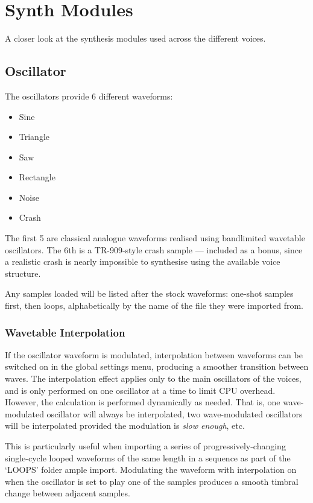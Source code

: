 \section{Synth Modules}\label{synth-modules}

A closer look at the synthesis modules used across the different voices.

\subsection{Oscillator}\label{oscillator}

The oscillators provide 6 different waveforms:

\begin{itemize}
\tightlist
\item
  Sine
\item
  Triangle
\item
  Saw
\item
  Rectangle
\item
  Noise
\item
  Crash
\end{itemize}

The first 5 are classical analogue waveforms realised using bandlimited
wavetable oscillators. The 6th is a TR-909-style crash sample ---
included as a bonus, since a realistic crash is nearly impossible to
synthesise using the available voice structure.

Any samples loaded will be listed after the stock waveforms: one-shot
samples first, then loops, alphabetically by the name of the file they
were imported from.

\subsubsection{Wavetable Interpolation}\label{wavetable-interpolation}

If the oscillator waveform is modulated, interpolation between waveforms
can be switched on in the global settings menu, producing a smoother
transition between waves. The interpolation effect applies only to the
main oscillators of the voices, and is only performed on one oscillator
at a time to limit CPU overhead. However, the calculation is performed
dynamically as needed. That is, one wave-modulated oscillator will
always be interpolated, two wave-modulated oscillators will be
interpolated provided the modulation is \emph{slow enough}, etc.

This is particularly useful when importing a series of
progressively-changing single-cycle looped waveforms of the same length
in a sequence as part of the `LOOPS' folder ample import. Modulating the
waveform with interpolation on when the oscillator is set to play one of
the samples produces a smooth timbral change between adjacent samples.

